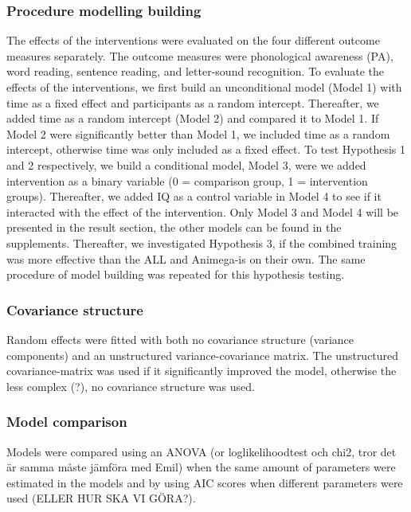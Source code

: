 \documentclass[
  english,
  ,man]{apa6}
\begin{document}
\hypertarget{procedure-modelling-building}{%
\subsubsection{Procedure modelling building}\label{procedure-modelling-building}}

The effects of the interventions were evaluated on the four different outcome measures separately. The outcome measures were phonological awareness (PA), word reading, sentence reading, and letter-sound recognition. To evaluate the effects of the interventions, we first build an unconditional model (Model 1) with time as a fixed effect and participants as a random intercept. Thereafter, we added time as a random intercept (Model 2) and compared it to Model 1. If Model 2 were significantly better than Model 1, we included time as a random intercept, otherwise time was only included as a fixed effect. To test Hypothesis 1 and 2 respectively, we build a conditional model, Model 3, were we added intervention as a binary variable (0 = comparison group, 1 = intervention groups). Thereafter, we added IQ as a control variable in Model 4 to see if it interacted with the effect of the intervention. Only Model 3 and Model 4 will be presented in the result section, the other models can be found in the supplements. Thereafter, we investigated Hypothesis 3, if the combined training was more effective than the ALL and Animega-is on their own. The same procedure of model building was repeated for this hypothesis testing.

\hypertarget{covariance-structure}{%
\subsubsection{Covariance structure}\label{covariance-structure}}

Random effects were fitted with both no covariance structure (variance components) and an unstructured variance-covariance matrix. The unstructured covariance-matrix was used if it significantly improved the model, otherwise the less complex (?), no covariance structure was used.

\hypertarget{model-comparison}{%
\subsubsection{Model comparison}\label{model-comparison}}

Models were compared using an ANOVA (or loglikelihoodtest och chi2, tror det är samma måste jämföra med Emil) when the same amount of parameters were estimated in the models and by using AIC scores when different parameters were used (ELLER HUR SKA VI GÖRA?).
\end{document}
